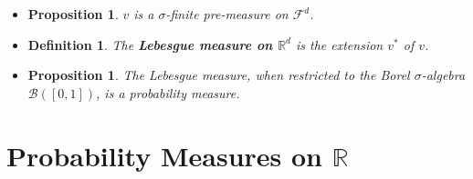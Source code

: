 \documentclass[10pt]{article}
\newtheorem{definition}[lemma]{Definition}
\newtheorem{proposition}[lemma]{Proposition}
\numberwithin{lemma}{section}
\newcommand{\mcal}[1]{\mathcal{#1}}
\newcommand{\Real}{\mathbb{R}}
\begin{document}
\begin{itemize}
  \item \begin{proposition}
    $v$ is a $\sigma$-finite pre-measure on $\mcal{F}^d$.
  \end{proposition}

  \item \begin{definition} \label{def:lebesgue-measure}
    The {\bf Lebesgue measure on $\Real^d$} is the extension $v^*$ of $v$.
  \end{definition}

  \item \begin{proposition}
    The Lebesgue measure, when restricted to the Borel $\sigma$-algebra $\mcal{B}([0,1])$, is a probability measure.
  \end{proposition}
\end{itemize}

\section{Probability Measures on $\Real$}
\end{document}
